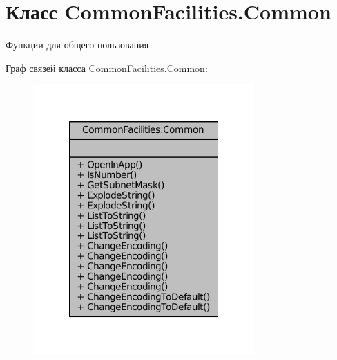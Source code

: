 \hypertarget{class_common_facilities_1_1_common}{}\section{Класс Common\+Facilities.\+Common}
\label{class_common_facilities_1_1_common}


Функции для общего пользования  




Граф связей класса Common\+Facilities.\+Common\+:
\nopagebreak
\begin{figure}[H]
\begin{center}
\leavevmode
\includegraphics[width=240pt]{class_common_facilities_1_1_common__coll__graph}
\end{center}
\end{figure}
